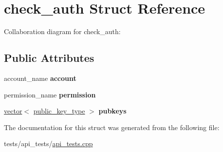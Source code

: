 \hypertarget{structcheck__auth}{}\section{check\+\_\+auth Struct Reference}
\label{structcheck__auth}


Collaboration diagram for check\+\_\+auth\+:
\subsection*{Public Attributes}
\begin{DoxyCompactItemize}
\item 
\mbox{\label{structcheck__auth_a34056dab9df6e37f9fdd2f4c1fb764a1}} 
account\+\_\+name {\bfseries account}
\item 
\mbox{\label{structcheck__auth_aa6e27f9bb014936c885dded76976df7e}} 
permission\+\_\+name {\bfseries permission}
\item 
\mbox{\label{structcheck__auth_a8febdd65cea4324c67876b1669090f62}} 
\mbox{\hyperlink{classstd_1_1vector}{vector}}$<$ \mbox{\hyperlink{classfc_1_1crypto_1_1public__key}{public\+\_\+key\+\_\+type}} $>$ {\bfseries pubkeys}
\end{DoxyCompactItemize}


The documentation for this struct was generated from the following file\+:\begin{DoxyCompactItemize}
\item 
tests/api\+\_\+tests/\mbox{\hyperlink{api__tests_8cpp}{api\+\_\+tests.\+cpp}}\end{DoxyCompactItemize}
